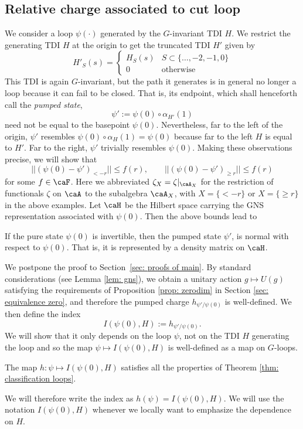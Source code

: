\subsection{Relative charge associated to cut loop}\label{sec: relative charge for cut loop}


We consider a loop $\psi(\cdot)$ generated by the $G$-invariant TDI $H$. 
We restrict the generating TDI $H$ at the origin to get the truncated TDI $H'$ given by
\begin{equation}\label{eq: tdi cut loop}
H'_{S}(s)= \begin{cases}   H_S(s)  &  S \subset \{\ldots,-2, -1,0\} \\  0 & \text{otherwise} \end{cases}  
\end{equation}
This TDI is again $G$-invariant, but the path it generates is in general no longer a loop because it can fail to be closed. That is, its endpoint, which shall henceforth call the \emph{pumped state},
$$
\psi':=  \psi(0) \circ \alpha_{H'}(1) 
$$
need not be equal to the basepoint $\psi(0)$.  Nevertheless, far to the left of the origin,  $\psi'$ resembles $\psi(0) \circ \alpha_{H}(1)=\psi(0)$ because far to the left $H$ is equal to $H'$. Far to the right,  $\psi'$ trivially resembles $\psi(0)$. Making these observations precise, we will show that
\begin{equation}\label{eq: same away from cut}
||(\psi(0)-\psi')_{< -r} || \leq f(r),\qquad  ||(\psi(0)-\psi')_{{\geq r}} || \leq f(r)
\end{equation}
for some $f\in \caF$. Here we abbreviated $\zeta_X=\zeta|_{\caA_X}$ for the restriction of functionals $\zeta$ on $\caA$ to the subalgebra $\caA_X$, with $X=\{{< -r}\}$ or $X=\{{\geq r}\}$ in the above examples. Let $\caH$ be the Hilbert space carrying the GNS representation associated with $\psi(0)$. Then the above bounds lead to
\begin{proposition}\label{prop: equivalence of states}
	If the pure state $\psi(0)$ is invertible, then the pumped state $\psi'$, is normal with respect to $\psi(0)$. That is, it is represented by a density matrix on $\caH$.
\end{proposition}
\noindent We postpone the proof to Section~\ref{sec: proofs of main}. 
By standard considerations (see Lemma \ref{lem: gns}), we obtain a unitary action $g\mapsto U(g)$ satisfying the requirements of Proposition \ref{prop: zerodim} in Section \ref{sec: equivalence zero},  and therefore  the pumped charge $h_{\psi'/{\psi(0)}}$ is well-defined. We then define the index
$$
I(\psi(0),H):=h_{\psi'/{\psi(0)}}.
$$
We will show that it only depends on the loop $\psi$, not on the TDI $H$ generating the loop and so the map $\psi \mapsto I(\psi(0),H) $ is well-defined as a map on $G$-loops.
\begin{theorem}\label{thm: pump index}
	The map $h : \psi \mapsto I(\psi(0),H) $ satisfies all the properties of Theorem \ref{thm: classification loops}.
\end{theorem}
We will therefore write the index as $h(\psi)=I(\psi(0),H)$. We will use the notation $I(\psi(0), H)$ whenever we locally want to emphasize the dependence on $H$.






